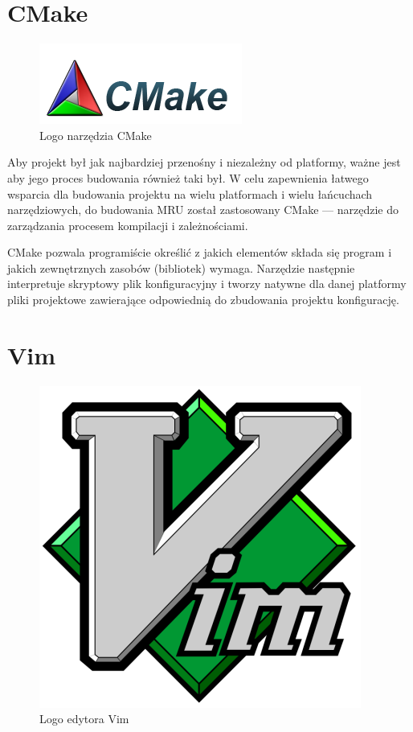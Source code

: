 \section{CMake}
\begin{figure}
\begin{center}
\includegraphics[scale=0.75]{img/cmake_logo.png}
\end{center}
\caption{Logo narzędzia CMake}
\end{figure}

\par
Aby projekt był jak najbardziej przenośny i niezależny od platformy, ważne jest aby jego proces budowania również taki był.
W celu zapewnienia łatwego wsparcia dla budowania projektu na wielu platformach i wielu łańcuchach narzędziowych, do budowania MRU został zastosowany CMake --- narzędzie do zarządzania procesem kompilacji i zależnościami.
\par
CMake pozwala programiście określić z jakich elementów składa się program i jakich zewnętrznych zasobów (bibliotek) wymaga. Narzędzie następnie interpretuje skryptowy plik konfiguracyjny i tworzy natywne dla danej platformy pliki projektowe zawierające odpowiednią do zbudowania projektu konfigurację.

\section{Vim}
\begin{figure}
\begin{center}
\includegraphics[scale=0.25]{img/vim_logo.png}
\end{center}
\caption{Logo edytora Vim}
\end{figure}

